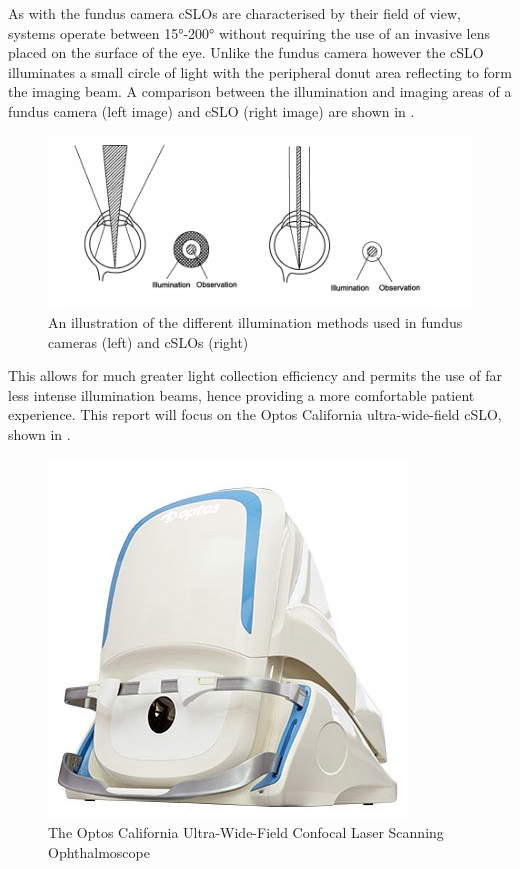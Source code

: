 As with the fundus camera cSLOs are characterised by their field of view, systems operate between 15°-200° without requiring the use of an invasive lens placed on the surface of the eye. Unlike the fundus camera however the cSLO illuminates a small circle of light with the peripheral donut area reflecting to form the imaging beam. A comparison between the illumination and imaging areas of a fundus camera (left image) and cSLO (right image) are shown in  .


\begin{figure}[htbp]
\centering
  \includegraphics{figures/illumination}
\caption{An illustration of the different illumination methods used in fundus cameras (left) and cSLOs (right) }
\label{fig:illum}
     \end{figure}


This allows for much greater light collection efficiency and permits the use of far less intense illumination beams, hence providing a more comfortable patient experience. This report will focus on the Optos California ultra-wide-field cSLO, shown in . 

\begin{figure}[htbp]
\centering
  \includegraphics{figures/california}
\caption{The Optos California Ultra-Wide-Field Confocal Laser Scanning Ophthalmoscope}
\label{fig:cali}
     \end{figure}


